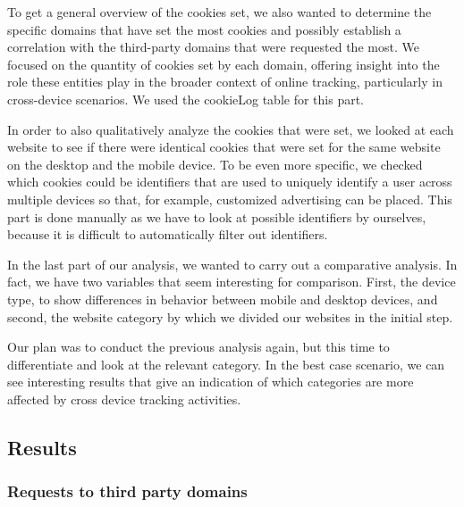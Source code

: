 To get a general overview of the cookies set, we also wanted to determine the specific domains that have set the most cookies and possibly establish a correlation with the third-party domains that were requested the most. We focused on the quantity of cookies set by each domain, offering insight into the role these entities play in the broader context of online tracking, particularly in cross-device scenarios. We used the cookieLog table for this part.

In order to also qualitatively analyze the cookies that were set, we looked at each website to see if there were identical cookies that were set for the same website on the desktop and the mobile device. To be even more specific, we checked which cookies could be identifiers that are used to uniquely identify a user across multiple devices so that, for example, customized advertising can be placed. This part is done manually as we have to look at possible identifiers by ourselves, because it is difficult to automatically filter out identifiers.

In the last part of our analysis, we wanted to carry out a comparative analysis. In fact, we have two variables that seem interesting for comparison. First, the device type, to show differences in behavior between mobile and desktop devices, and second, the website category by which we divided our websites in the initial step.

Our plan was to conduct the previous analysis again, but this time to differentiate and look at the relevant category. In the best case scenario, we can see interesting results that give an indication of which categories are more affected by cross device tracking activities.

\subsection{Results}
\subsubsection{Requests to third party domains}
